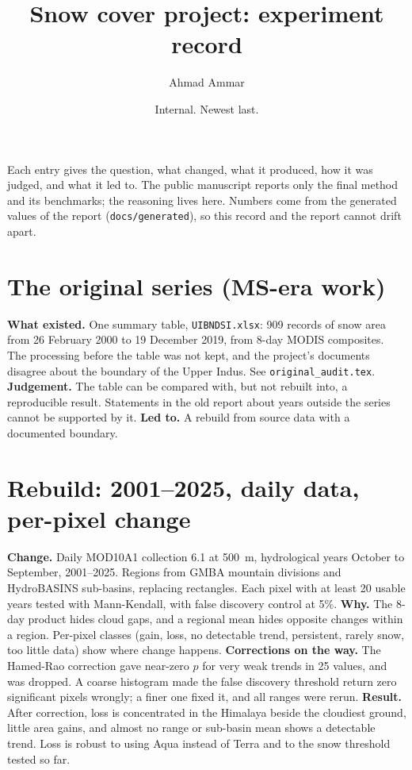 \documentclass[11pt,a4paper]{article}
\title{Snow cover project: experiment record}
\author{Ahmad Ammar}
\date{Internal. Newest last.}
\begin{document}
\maketitle
Each entry gives the question, what changed, what it produced, how it was judged, and what it led to. The public
manuscript reports only the final method and its benchmarks; the reasoning lives here. Numbers come from the
generated values of the report (\texttt{docs/generated}), so this record and the report cannot drift apart.

\section{The original series (MS-era work)}
\textbf{What existed.} One summary table, \texttt{UIBNDSI.xlsx}: 909 records of snow area from 26 February 2000 to
19 December 2019, from 8-day MODIS composites. The processing before the table was not kept, and the project's documents
disagree about the boundary of the Upper Indus. See \texttt{original\_audit.tex}.
\textbf{Judgement.} The table can be compared with, but not rebuilt into, a reproducible result. Statements in the old
report about years outside the series cannot be supported by it.
\textbf{Led to.} A rebuild from source data with a documented boundary.

\section{Rebuild: 2001--2025, daily data, per-pixel change}
\textbf{Change.} Daily MOD10A1 collection 6.1 at 500~m, hydrological years October to September, 2001--2025. Regions
from GMBA mountain divisions and HydroBASINS sub-basins, replacing rectangles. Each pixel with at least 20 usable years
tested with Mann-Kendall, with false discovery control at 5\%.
\textbf{Why.} The 8-day product hides cloud gaps, and a regional mean hides opposite changes within a region. Per-pixel
classes (gain, loss, no detectable trend, persistent, rarely snow, too little data) show where change happens.
\textbf{Corrections on the way.} The Hamed-Rao correction gave near-zero $p$ for very weak trends in 25 values, and was
dropped. A coarse histogram made the false discovery threshold return zero significant pixels wrongly; a finer one
fixed it, and all ranges were rerun.
\textbf{Result.} After correction, loss is concentrated in the Himalaya beside the cloudiest ground, little area gains,
and almost no range or sub-basin mean shows a detectable trend. Loss is robust to using Aqua instead of Terra and to the
snow threshold tested so far.
\end{document}
